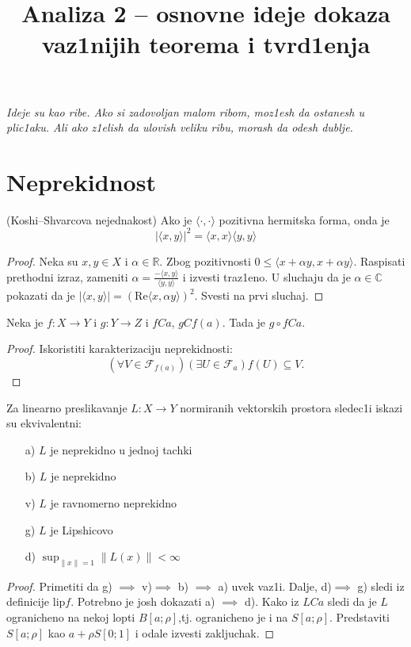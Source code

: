 \documentclass[a4paper,12pt]{article}
\title{\textbf{Analiza 2 -- osnovne ideje dokaza vaz1nijih teorema i tvrd1enja }}
\date{}
\newcommand{\RR}{\mathbb{R}}
\newcommand{\CC}{\mathbb{C}}
\newcommand{\psj}{\subseteq}
\newcommand{\norm}[1]{\left\lVert#1\right\rVert}
\begin{document}
\maketitle

\textit{Ideje su kao ribe. Ako si zadovoljan malom ribom, moz1esh da ostanesh u plic1aku. Ali ako z1elish da ulovish veliku ribu, morash da odesh dublje.}

\section{Neprekidnost}

\begin{tvr}
(Koshi--Shvarcova nejednakost) Ako je $\langle \cdot, \cdot \rangle$ pozitivna hermit\-ska forma, onda je 
\[{|\langle x, y \rangle |}^2 = \langle x, x \rangle \langle y, y \rangle\]
\end{tvr}
\begin{proof}
Neka su $x, y \in X$ i $\alpha \in \RR$. Zbog pozitivnosti $0 \leq \langle x + \alpha y, x + \alpha y \rangle$. Raspisati prethodni izraz, zameniti $\alpha = \frac{- \langle x, y \rangle }{\langle y, y \rangle}$ i izvesti traz1eno. U sluchaju da je $\alpha \in \CC$ pokazati da je $|\langle x, y \rangle | = {( \mathrm{Re} \langle x, \alpha y \rangle)}^2$. Svesti na prvi sluchaj.
\end{proof}

\begin{tvr}
	Neka je $f:X\to Y$ i $g: Y\to Z$ i $f C a$, $g C f(a)$. Tada je $g\circ f C a$.
\end{tvr}
\begin{proof}
	Iskoristiti karakterizaciju neprekidnosti:
	\[ (\forall V \in \mathcal F_{f(a)})(\exists U \in \mathcal F_{a}) f(U)\psj V .\]
\end{proof}

\begin{tvr}
Za linearno preslikavanje $L:X \to Y$ normiranih vektorskih prostora sledec1i iskazi su ekvivalentni:
\begin{itemize}
\item[a)] $L$ je neprekidno u jednoj tachki
\item[b)] $L$ je neprekidno
\item[v)] $L$ je ravnomerno neprekidno
\item[g)] $L$ je Lipshicovo
\item[d)] $\sup_{\norm{x} = 1} \norm{L(x)} < \infty$
\end{itemize}
\end{tvr}
\begin{proof}
Primetiti da g) $\implies$ v)$ \implies$ b) $ \implies$ a) uvek vaz1i. Dalje, d)$ \implies$ g) sledi iz definicije $\mathrm{lip} f$. Potrebno je josh dokazati a) $\implies$ d). Kako iz $LCa$ sledi da je $L$ ogranicheno na nekoj lopti $B[a; \rho]$,tj. ogranicheno je i na $S[a; \rho]$. Predstaviti $S[a;\rho]$ kao $a + \rho S[0;1]$ i odale izvesti zakljuchak.
\end{proof}
\end{document}
